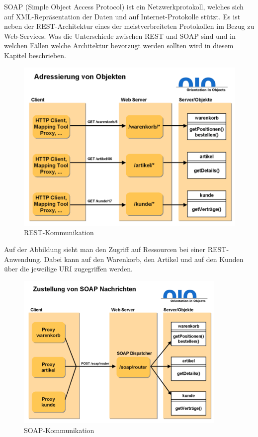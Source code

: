 \pagebreak


SOAP (Simple Object Access Protocol) ist ein Netzwerkprotokoll, welches sich auf XML-Repräsentation der Daten und auf Internet-Protokolle stützt. Es ist neben der REST-Architektur eines der meistverbreiteten Protokollen im Bezug zu Web-Services. Was die Unterschiede zwischen REST und SOAP sind und in welchen Fällen welche Architektur bevorzugt werden sollten wird in diesem Kapitel beschrieben. 

\begin{figure}[H]
    \centering
    \includegraphics{media/REST/restcomm.png}
    \caption{REST-Kommunikation \cite{RestSoap}}
\end{figure}

Auf der Abbildung sieht man den Zugriff auf Ressourcen bei einer REST-Anwendung. Dabei kann auf den Warenkorb, den Artikel und auf den Kunden über die jeweilige URI zugegriffen werden. 

\begin{figure}[H]
    \centering
    \includegraphics[width=0.9\textwidth]{media/REST/soapcomm.png}
    \caption{SOAP-Kommunikation \cite{RestSoap}}
\end{figure}

